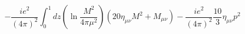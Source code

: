 \begin{equation}
-\frac{ie^{2}}{(4\pi)^{2}}\int_{0}^{1}dz\left(\ln\frac{M^{2}}{4\pi\mu^{2}}\right)\left(20\eta_{\mu\nu}M^{2}
+\textit{M}_{\mu\nu}\right)-\frac{ie^{2}}{(4\pi)^{2}}\frac{10}{3}\eta_{\mu\nu}p^{2}
\end{equation}

